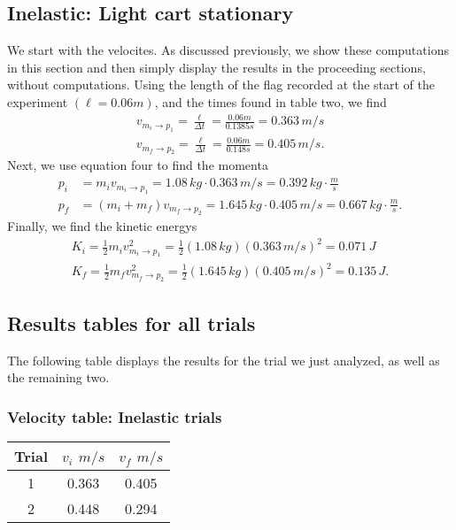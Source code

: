 \documentclass{report}
\begin{document}
    \bigbreak \noindent 
    \subsection{Inelastic: Light cart stationary}
    \bigbreak \noindent 
    We start with the velocites. As discussed previously, we show these computations in this section and then simply display the results in the proceeding sections, without computations. 
    \bigbreak \noindent 
    Using the length of the flag recorded at the start of the experiment $(\ell = 0.06m)$, and the times found in table two, we find
    \begin{align*}
        v_{m_{i}\rightarrow p_{1}} = \frac{\ell}{\Delta t} = \frac{0.06m}{0.1385s} = 0.363\, m/s \\
        v_{m_{f} \rightarrow p_{2}} = \frac{\ell}{\Delta t} = \frac{0.06m}{0.148s} = 0.405\, m/s
    .\end{align*}
    \bigbreak \noindent 
    Next, we use equation four to find the momenta
    \begin{align*}
        p_{i} &= m_{i}v_{m_{i}\rightarrow p_{1}} = 1.08\, kg \cdot 0.363\, m/s = 0.392\, kg \cdot \frac{m}{s} \\
        p_{f} &= (m_{i} + m_{f})v_{m_{f} \rightarrow p_{2}} = 1.645\, kg \cdot 0.405\, m/s = 0.667\, kg \cdot \frac{m}{s}
    .\end{align*}
    \bigbreak \noindent 
    Finally, we find the kinetic energys
    \begin{align*}
        K_{i} = \frac{1}{2}m_{i}v_{m_{i} \rightarrow p_{1}}^{2} = \frac{1}{2}(1.08\, kg)(0.363\, m/s)^{2} = 0.071\, J \\
        K_{f} = \frac{1}{2}m_{f}v_{m_{f} \rightarrow p_{2}}^{2} = \frac{1}{2}(1.645\, kg)(0.405\, m/s)^{2} = 0.135\, J
    .\end{align*}

    \bigbreak \noindent 
    \subsection{Results tables for all trials}
    The following table displays the results for the trial we just analyzed, as well as the remaining two.
    \bigbreak \noindent 
    \subsubsection{Velocity table: Inelastic trials}
    \bigbreak \noindent 
    \begin{center}
        \begin{tabular}{c|c|c}
            Trial & $v_{i}$ $m/s$ & $v_{f}$ $m/s$\\
            \hline
            1 & 0.363  & 0.405 \\ 
            2  & 0.448  & 0.294 
        \end{tabular}
    \end{center}
    \bigbreak \noindent 
\end{document}
